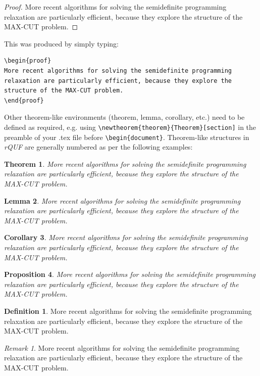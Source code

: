 \documentclass{rQUF2e}
\theoremstyle{plain}
\newtheorem{theorem}{Theorem}[section]
\newtheorem{corollary}[theorem]{Corollary}
\newtheorem{lemma}[theorem]{Lemma}
\newtheorem{proposition}[theorem]{Proposition}
\theoremstyle{definition}
\newtheorem{definition}{Definition}
\theoremstyle{remark}
\newtheorem{remark}{Remark}
\begin{document}
\begin{proof}
More recent algorithms for solving the semidefinite programming relaxation
are particularly efficient, because they explore the structure of the
MAX-CUT problem.
\end{proof}
\noindent This was produced by simply typing:
\begin{verbatim}
\begin{proof}
More recent algorithms for solving the semidefinite programming
relaxation are particularly efficient, because they explore the
structure of the MAX-CUT problem.
\end{proof}
\end{verbatim}
Other theorem-like environments (theorem, lemma, corollary, etc.) need to be defined as required, e.g. using \verb"\newtheorem{theorem}{Theorem}[section]"
in the preamble of your .tex file before \verb"\begin{document}". Theorem-like structures in \textit{rQUF} are generally numbered as per the following examples:
\begin{theorem}
More recent algorithms for solving the semidefinite programming
relaxation are particularly efficient, because they explore the structure
of the MAX-CUT problem.
\end{theorem}
\begin{lemma}
More recent algorithms for solving the semidefinite programming
relaxation are particularly efficient, because they explore the structure
of the MAX-CUT problem.
\end{lemma}
\begin{corollary}
More recent algorithms for solving the semidefinite programming
relaxation are particularly efficient, because they explore the
structure of the MAX-CUT problem.
\end{corollary}
\begin{proposition}
More recent algorithms for solving the semidefinite programming
relaxation are particularly efficient, because they explore the
structure of the MAX-CUT problem.
\end{proposition}
\begin{definition}
More recent algorithms for solving the semidefinite programming
relaxation are particularly efficient, because they explore the
structure of the MAX-CUT problem.
\end{definition}
\begin{remark}
More recent algorithms for solving the semidefinite programming
relaxation are particularly efficient, because they explore the
structure of the MAX-CUT problem.
\end{remark}
\end{document}
